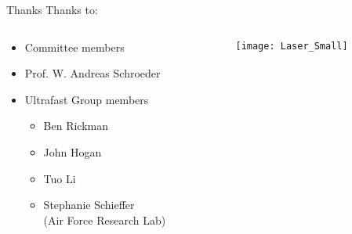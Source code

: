 \begin{frame}{Thanks}
Thanks to:
\begin{columns}
  \begin{column}{.49\linewidth}
    \begin{itemize}
      \item Committee members
      \item Prof. W. Andreas Schroeder
      \item Ultrafast Group members
      \begin{itemize}
        \item Ben Rickman
        \item John Hogan
        \item Tuo Li
        \item Stephanie Schieffer\\(Air Force Research Lab)
      \end{itemize}
    \end{itemize}
  \end{column}
  \begin{column}{.49\linewidth}
    \begin{center}
      \texttt{[image: Laser\_Small]}
    \end{center}
  \end{column}
\end{columns}
\end{frame}

